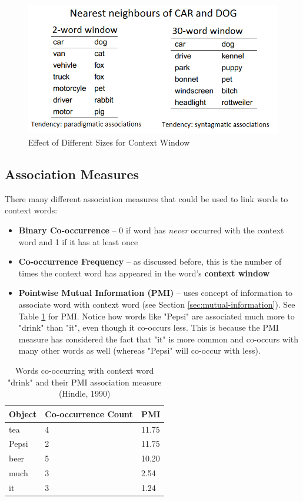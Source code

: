 \documentclass{article}
\begin{document}
\begin{figure}
	\centering
	\includegraphics[scale=0.55]{figures/size-of-window.png}
	\caption{Effect of Different Sizes for Context Window}
	\label{fig:size-of-context-effect}
\end{figure}

\subsection{Association Measures}
\label{sec:association-measures}

There many different association measures that could be used to link words to context words:
\begin{itemize}
	\item \textbf{Binary Co-occurrence} -- 0 if word has \textit{never} occurred with the context word and 1 if it has at least once
	\item \textbf{Co-occurrence Frequency} -- as discussed before, this is the number of times the context word has appeared in the word's \textbf{context window}
	\item \textbf{Pointwise Mutual Information (PMI)} -- uses concept of information to associate word with context word (see Section \ref{sec:mutual-information}). See Table \ref{tab:pmu-association-example} for PMI. Notice how words like "Pepsi" are associated much more to "drink" than "it", even though it co-occurs less. This is because the PMI measure has considered the fact that "it" is more common and co-occurs with many other words as well (whereas "Pepsi" will co-occur with less).
\end{itemize}

\begin{table}
	\centering
	\begin{tabular}{|l|l|l|}
		\hline
		\textbf{Object} & \textbf{Co-occurrence Count} & \textbf{PMI} \\
		\hline
		tea & 4 & 11.75 \\
		Pepsi & 2 & 11.75 \\
		beer & 5 & 10.20 \\
		much & 3 & 2.54 \\
		it & 3 & 1.24 \\
		\hline
	\end{tabular}
	\caption{Words co-occurring with context word "drink" and their PMI association measure (Hindle, 1990)}
	\label{tab:pmu-association-example}
\end{table}
\end{document}
